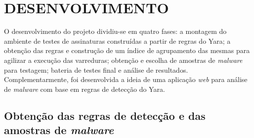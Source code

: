 \chapter{DESENVOLVIMENTO}
\label{c.Desenvolvimento}

O desenvolvimento do projeto dividiu-se em quatro fases: a montagem do ambiente de testes de assinaturas construídas
a partir de regras do Yara; a obtenção das regras e construção de um índice de agrupamento das mesmas para agilizar a
execução das varreduras; obtenção e escolha de amostras de \textit{malware} para testagem; bateria de testes final e
análise de resultados. Complementarmente, foi desenvolvida a ideia de uma aplicação \textit{web} para análise
de \textit{malware} com base em regras de detecção do Yara.

\section{Obtenção das regras de detecção e das amostras de \textit{malware}}
\label{s.obtregras}

